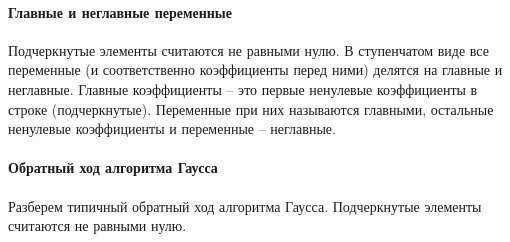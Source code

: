 \paragraph{Главные и неглавные переменные}
Подчеркнутые элементы считаются не равными нулю.
В ступенчатом виде все переменные (и соответственно коэффициенты перед ними) делятся на главные и неглавные.
Главные коэффициенты -- это первые ненулевые коэффициенты в строке (подчеркнутые).
Переменные при них называются главными, остальные ненулевые коэффициенты и переменные -- неглавные.


\paragraph{Обратный ход алгоритма Гаусса}
Разберем типичный обратный ход алгоритма Гаусса.
Подчеркнутые элементы считаются не равными нулю.
